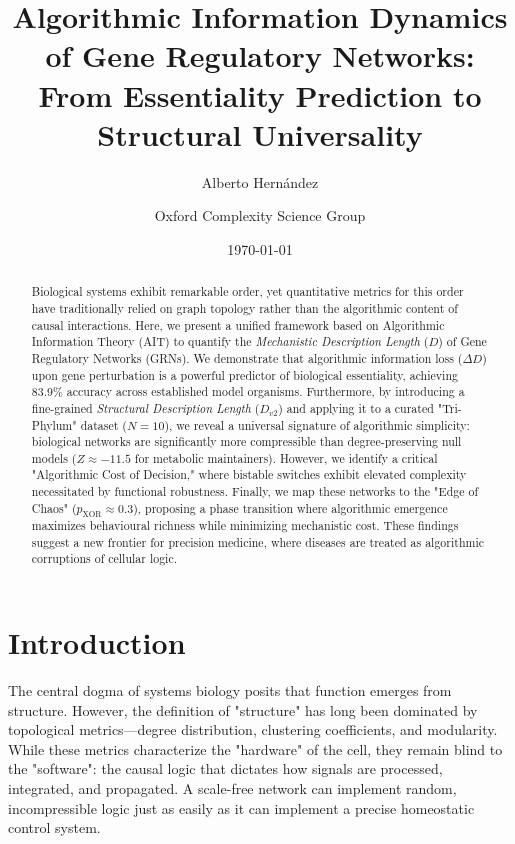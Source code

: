 \documentclass{article}
\title{Algorithmic Information Dynamics of Gene Regulatory Networks: From Essentiality Prediction to Structural Universality}
\author[1]{Alberto Hernández}
\author[1]{Oxford Complexity Science Group}
\affil[1]{Department of Computer Science, University of Oxford}
\date{\today}
\begin{document}
\maketitle

\begin{abstract}
Biological systems exhibit remarkable order, yet quantitative metrics for this order have traditionally relied on graph topology rather than the algorithmic content of causal interactions. Here, we present a unified framework based on Algorithmic Information Theory (AIT) to quantify the \textit{Mechanistic Description Length} ($D$) of Gene Regulatory Networks (GRNs). We demonstrate that algorithmic information loss ($\Delta D$) upon gene perturbation is a powerful predictor of biological essentiality, achieving 83.9\% accuracy across established model organisms. Furthermore, by introducing a fine-grained \textit{Structural Description Length} ($D_{v2}$) and applying it to a curated "Tri-Phylum" dataset ($N=10$), we reveal a universal signature of algorithmic simplicity: biological networks are significantly more compressible than degree-preserving null models ($Z \approx -11.5$ for metabolic maintainers). However, we identify a critical "Algorithmic Cost of Decision," where bistable switches exhibit elevated complexity necessitated by functional robustness. Finally, we map these networks to the "Edge of Chaos" ($p_{\mathrm{XOR}} \approx 0.3$), proposing a phase transition where algorithmic emergence maximizes behavioural richness while minimizing mechanistic cost. These findings suggest a new frontier for precision medicine, where diseases are treated as algorithmic corruptions of cellular logic.
\end{abstract}

\section{Introduction}

The central dogma of systems biology posits that function emerges from structure. However, the definition of "structure" has long been dominated by topological metrics—degree distribution, clustering coefficients, and modularity. While these metrics characterize the "hardware" of the cell, they remain blind to the "software": the causal logic that dictates how signals are processed, integrated, and propagated. A scale-free network can implement random, incompressible logic just as easily as it can implement a precise homeostatic control system.
\end{document}
